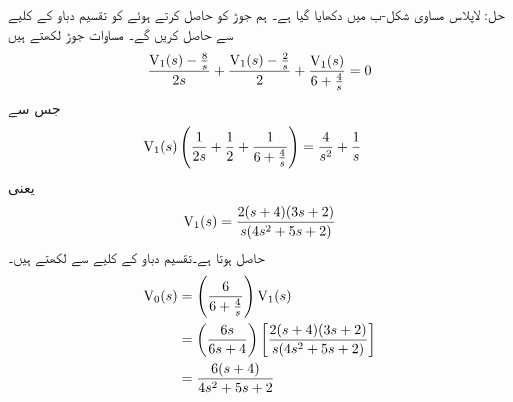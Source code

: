 حل: لاپلاس مساوی شکل-ب میں دکھایا گیا ہے۔ ہم جوڑ  کو حاصل کرتے ہوئے  کو تقسیم دباو کے کلیے سے حاصل کریں گے۔ مساوات جوڑ لکھتے ہیں
\begin{align*}
\frac{{{\textup{V}}}_1(s)-\frac{8}{s}}{2s}+\frac{{{\textup{V}}}_1(s)-\frac{2}{s}}{2}+\frac{{{\textup{V}}}_1(s)}{6+\frac{4}{s}}=0
\end{align*}
جس سے
\begin{align*}
{\ensuremath{{\textup{V}}}}_1(s)\left(\frac{1}{2s}+\frac{1}{2}+\frac{1}{6+\frac{4}{s}}\right)&=\frac{4}{s^2}+\frac{1}{s}
\end{align*}
یعنی
\begin{align*}
{\ensuremath{{\textup{V}}}}_1(s)=\frac{2(s+4)(3s+2)}{s(4s^2+5s+2)}
\end{align*}
حاصل ہوتا ہے۔تقسیم دباو کے کلیے سے  لکھتے ہیں۔
\begin{align*}
{\ensuremath{{\textup{V}}}}_0(s)&=\left(\frac{6}{6+\frac{4}{s}}\right){{\textup{V}}}_1(s)\\
&=\left(\frac{6s}{6s+4}\right)\left[\frac{2(s+4)(3s+2)}{s(4s^2+5s+2)}\right]\\
&=\frac{6(s+4)}{4s^2+5s+2}
\end{align*}

